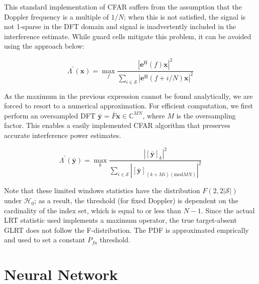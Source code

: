 \documentclass[11pt]{article}
\begin{document}
This standard implementation of CFAR suffers from the assumption that the Doppler frequency is a multiple of $1/N$; when this is not satisfied, the signal is not 1-sparse in the DFT domain and signal is inadvertently included in the interference estimate. While guard cells mitigate this problem, it can be avoided using the approach below:

\begin{equation}
\Lambda^\prime(\bm{x})= \max_f \frac{\left|\bm{e}^\text{H}(f)\bm{x}\right|^2}{\sum_{i \in \mathcal{S}}\left|\bm{e}^\text{H}(f+i/N)\bm{x}\right|^2}
\end{equation}

As the maximum in the previous expression cannot be found analytically, we are forced to resort to a numerical approximation. For efficient computation, we first perform an oversampled DFT $\bar{\bm{y}}=\bar{F}\bm{x} \in \mathbb{C}^{MN}$, where $M$ is the oversampling factor. This enables a easily implemented CFAR algorithm that preserves accurate interference power estimates.


\begin{equation}
\Lambda^\prime(\bar{\bm{y}})= \max_k \frac{\left|[\bar{\bm{y}}]_k\right|^2}{\sum_{i \in \mathcal{S}}\left|[\bar{\bm{y}}]_{(k+Mi)(\text{mod}MN)}\right|^2}
\end{equation}

Note that these limited windows statistics have the distribution $F(2,2|\mathcal{S}|)$ under $\mathcal{H}_0$; as a result, the threshold (for fixed Doppler) is dependent on the cardinality of the index set, which is equal to or less than $N-1$. Since the actual LRT statistic used implements a maximum operator, the true target-absent GLRT does not follow the F-distribution. The PDF is approximated emprically and used to set a constant $P_{fa}$ threshold.




\section{Neural Network}
\end{document}
